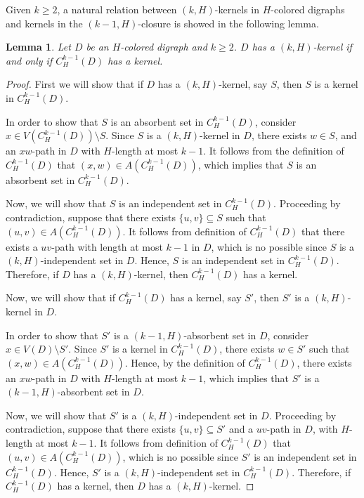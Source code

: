\documentclass[10pt,a4paper]{article}
\newtheorem{lemma}[theorem]{Lemma}
\begin{document}
 Given $k \geq 2$, a natural relation between $(k,H)$-kernels in $H$-colored digraphs and kernels in the $(k-1,H)$-closure is showed in the following lemma.

\begin{lemma}
\label{closure}
Let $D$ be an $H$-colored digraph and  $k \geq 2$. $D$ has a $(k,H)$-kernel if and only if $C_{H}^{k-1}(D)$ has a kernel.
\end{lemma}
\begin{proof}
First we will show that if $D$ has a $(k,H)$-kernel, say $S$, then $S$ is a kernel in $C^{k-1}_{H}(D)$.

In order to show that $S$ is an absorbent set in $C^{k-1}_{H}(D)$, consider $x \in V(C^{k-1}_{H}(D)) \setminus S$. Since $S$ is a $(k,H)$-kernel in $D$,  there exists $w \in S$, and an $xw$-path in $D$ with $H$-length at most $k-1$. It follows from the definition of $C^{k-1}_{H}(D)$ that $(x,w) \in A(C^{k-1}_{H}(D))$, which implies that $S$ is an absorbent set in $C^{k-1}_{H}(D)$.

Now, we will show that $S$ is an independent set in $C^{k-1}_{H}(D)$. Proceeding by contradiction, suppose that there exists $\{ u, v \} \subseteq S$ such that $(u,v) \in A(C^{k-1}_{H}(D))$. It follows from definition of $C^{k-1}_{H}(D)$ that there exists a $uv$-path with length at most $k-1$ in $D$, which is no possible since $S$ is a $(k,H)$-independent set in $D$. Hence, $S$ is an independent set in $C^{k-1}_{H}(D)$. Therefore, if  $D$ has a $(k,H)$-kernel, then $C_{H}^{k-1}(D)$ has a kernel.

Now, we will show that if $C^{k-1}_{H}(D)$ has a kernel, say $S'$, then $S'$ is a $(k,H)$-kernel in $D$.

In order to show that $S'$ is a $(k-1,H)$-absorbent set in $D$, consider $x \in V(D) \setminus S'$. Since $S'$ is a kernel in $C^{k-1}_{H}(D)$, there exists $w \in S'$ such that $(x,w) \in A(C^{k-1}_{H}(D))$. Hence, by the definition of $C^{k-1}_{H}(D)$, there exists an $xw$-path in $D$ with $H$-length at most $k-1$, which implies that $S'$ is a $(k-1,H)$-absorbent set in $D$.

Now, we will show that $S'$ is a $(k,H)$-independent set in $D$. Proceeding by contradiction, suppose that there exists $\{ u, v \} \subseteq S'$ and a $uv$-path in $D$, with $H$-length at most $k-1$. It follows from definition of $C^{k-1}_{H}(D)$ that $(u,v) \in A(C^{k-1}_{H}(D))$, which is no possible since $S'$ is an independent set in $C^{k-1}_{H}(D)$. Hence, $S'$ is a $(k,H)$-independent set in $C^{k-1}_{H}(D)$. Therefore, if  $C^{k-1}_{H}(D)$ has a kernel, then $D$ has a $(k,H)$-kernel.
\end{proof}
\end{document}

